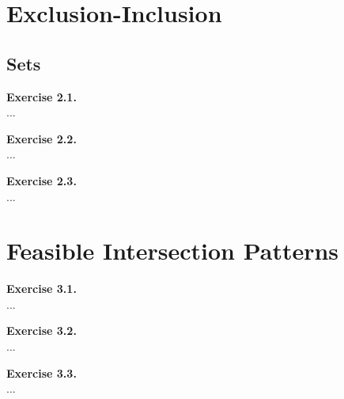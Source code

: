 \documentclass{article}
\begin{document}
\section{Exclusion-Inclusion}
\subsection{Sets}

\begin{flushleft}
\textbf{Exercise 2.1.} \\
...

\textbf{Exercise 2.2.} \\
...

\textbf{Exercise 2.3.} \\
...

\end{flushleft}
\section{Feasible Intersection Patterns}

\begin{flushleft}
\textbf{Exercise 3.1.} \\
...

\textbf{Exercise 3.2.} \\
...

\textbf{Exercise 3.3.} \\
...
\end{flushleft}
\end{document}
